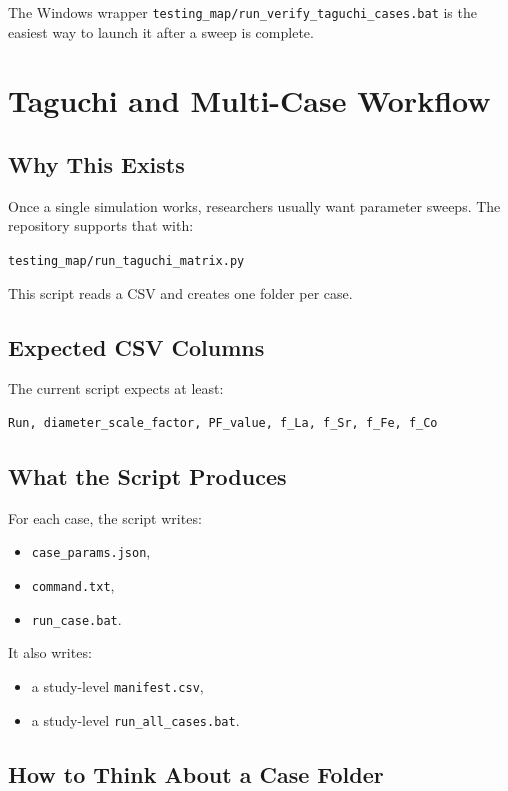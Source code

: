 \documentclass[11pt]{article}
\begin{document}
The Windows wrapper \texttt{testing\_map/run\_verify\_taguchi\_cases.bat} is the easiest way to launch it after a sweep is complete.

\section{Taguchi and Multi-Case Workflow}

\subsection{Why This Exists}

Once a single simulation works, researchers usually want parameter sweeps. The repository supports that with:
\begin{center}
\texttt{testing\_map/run\_taguchi\_matrix.py}
\end{center}

This script reads a CSV and creates one folder per case.

\subsection{Expected CSV Columns}

The current script expects at least:
\begin{Verbatim}[fontsize=\small]
Run, diameter_scale_factor, PF_value, f_La, f_Sr, f_Fe, f_Co
\end{Verbatim}

\subsection{What the Script Produces}

For each case, the script writes:
\begin{itemize}
  \item \texttt{case\_params.json},
  \item \texttt{command.txt},
  \item \texttt{run\_case.bat}.
\end{itemize}

It also writes:
\begin{itemize}
  \item a study-level \texttt{manifest.csv},
  \item a study-level \texttt{run\_all\_cases.bat}.
\end{itemize}

\subsection{How to Think About a Case Folder}
\end{document}
